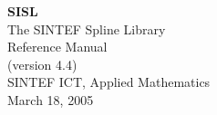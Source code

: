 \def \RR{\hbox{\rm I\negthinspace R}}

\pagestyle{headings}
\makeindex


\begin{titlepage}
  \vspace{5 cm}
  \begin{center}
  \Huge
  \textbf{SISL} \\
  \huge
  The SINTEF Spline Library \\ 
  \LARGE
  Reference Manual \\
  (version 4.4)\\ 
  \vspace{10 mm}
  \large
  SINTEF ICT, Applied Mathematics \\
  March 18, 2005
  \end{center}

\end{titlepage}

\tableofcontents
\cleardoublepage
{}
\setcounter{page}{1}

\cleardoublepage

\cleardoublepage

\cleardoublepage

\cleardoublepage

\cleardoublepage

\cleardoublepage

\cleardoublepage

\cleardoublepage

\cleardoublepage

\cleardoublepage

\cleardoublepage
%
\printindex

